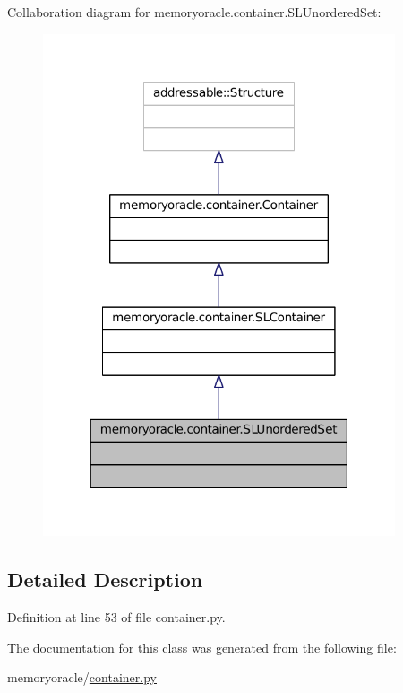 Collaboration diagram for memoryoracle.\+container.\+S\+L\+Unordered\+Set\+:\nopagebreak
\begin{figure}[H]
\begin{center}
\leavevmode
\includegraphics[width=295pt]{classmemoryoracle_1_1container_1_1SLUnorderedSet__coll__graph}
\end{center}
\end{figure}


\subsection{Detailed Description}


Definition at line 53 of file container.\+py.



The documentation for this class was generated from the following file\+:\begin{DoxyCompactItemize}
\item 
memoryoracle/\hyperlink{container_8py}{container.\+py}\end{DoxyCompactItemize}
